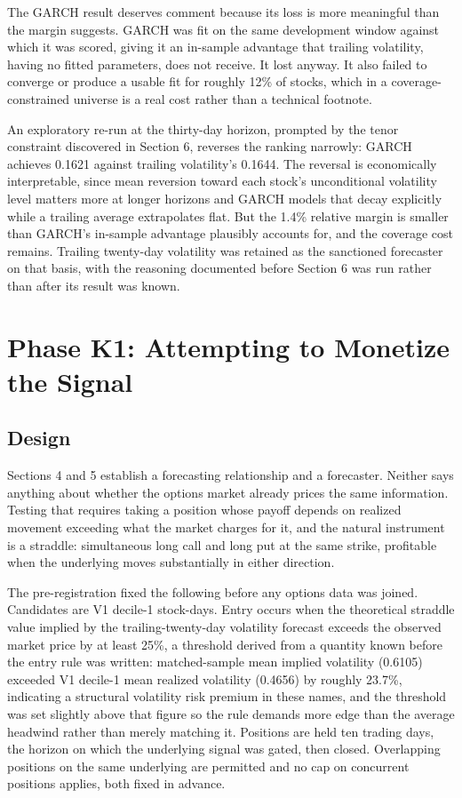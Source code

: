 \documentclass[11pt]{article}
\begin{document}
The GARCH result deserves comment because its loss is more meaningful than the margin suggests. GARCH was fit on the same development window against which it was scored, giving it an in-sample advantage that trailing volatility, having no fitted parameters, does not receive. It lost anyway. It also failed to converge or produce a usable fit for roughly 12\% of stocks, which in a coverage-constrained universe is a real cost rather than a technical footnote.

An exploratory re-run at the thirty-day horizon, prompted by the tenor constraint discovered in Section 6, reverses the ranking narrowly: GARCH achieves 0.1621 against trailing volatility's 0.1644. The reversal is economically interpretable, since mean reversion toward each stock's unconditional volatility level matters more at longer horizons and GARCH models that decay explicitly while a trailing average extrapolates flat. But the 1.4\% relative margin is smaller than GARCH's in-sample advantage plausibly accounts for, and the coverage cost remains. Trailing twenty-day volatility was retained as the sanctioned forecaster on that basis, with the reasoning documented before Section 6 was run rather than after its result was known.
\section{Phase K1: Attempting to Monetize the Signal}
\subsection{Design}

Sections 4 and 5 establish a forecasting relationship and a forecaster. Neither says anything about whether the options market already prices the same information. Testing that requires taking a position whose payoff depends on realized movement exceeding what the market charges for it, and the natural instrument is a straddle: simultaneous long call and long put at the same strike, profitable when the underlying moves substantially in either direction.

The pre-registration fixed the following before any options data was joined. Candidates are V1 decile-1 stock-days. Entry occurs when the theoretical straddle value implied by the trailing-twenty-day volatility forecast exceeds the observed market price by at least 25\%, a threshold derived from a quantity known before the entry rule was written: matched-sample mean implied volatility (0.6105) exceeded V1 decile-1 mean realized volatility (0.4656) by roughly 23.7\%, indicating a structural volatility risk premium in these names, and the threshold was set slightly above that figure so the rule demands more edge than the average headwind rather than merely matching it. Positions are held ten trading days, the horizon on which the underlying signal was gated, then closed. Overlapping positions on the same underlying are permitted and no cap on concurrent positions applies, both fixed in advance.
\end{document}
